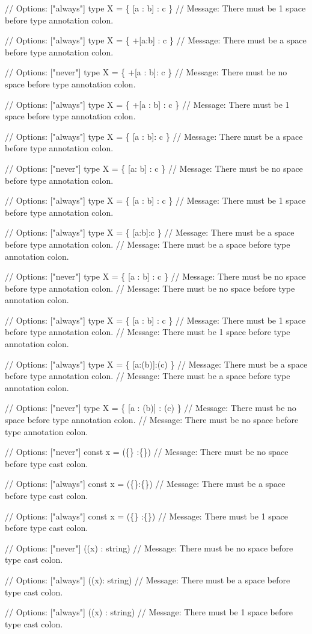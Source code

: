 \begin{DoxyCode}
// Options: ["always"]
type X = \{ [a  : b] : c \}
// Message: There must be 1 space before type annotation colon.

// Options: ["always"]
type X = \{ +[a:b] : c \}
// Message: There must be a space before type annotation colon.

// Options: ["never"]
type X = \{ +[a : b]: c \}
// Message: There must be no space before type annotation colon.

// Options: ["always"]
type X = \{ +[a  : b] : c \}
// Message: There must be 1 space before type annotation colon.

// Options: ["always"]
type X = \{ [a : b]: c \}
// Message: There must be a space before type annotation colon.

// Options: ["never"]
type X = \{ [a: b] : c \}
// Message: There must be no space before type annotation colon.

// Options: ["always"]
type X = \{ [a : b]  : c \}
// Message: There must be 1 space before type annotation colon.

// Options: ["always"]
type X = \{ [a:b]:c \}
// Message: There must be a space before type annotation colon.
// Message: There must be a space before type annotation colon.

// Options: ["never"]
type X = \{ [a : b] : c \}
// Message: There must be no space before type annotation colon.
// Message: There must be no space before type annotation colon.

// Options: ["always"]
type X = \{ [a  : b]  : c \}
// Message: There must be 1 space before type annotation colon.
// Message: There must be 1 space before type annotation colon.

// Options: ["always"]
type X = \{ [a:(b)]:(c) \}
// Message: There must be a space before type annotation colon.
// Message: There must be a space before type annotation colon.

// Options: ["never"]
type X = \{ [a : (b)] : (c) \}
// Message: There must be no space before type annotation colon.
// Message: There must be no space before type annotation colon.

// Options: ["never"]
const x = (\{\} :\{\})
// Message: There must be no space before type cast colon.

// Options: ["always"]
const x = (\{\}:\{\})
// Message: There must be a space before type cast colon.

// Options: ["always"]
const x = (\{\}  :\{\})
// Message: There must be 1 space before type cast colon.

// Options: ["never"]
((x) : string)
// Message: There must be no space before type cast colon.

// Options: ["always"]
((x): string)
// Message: There must be a space before type cast colon.

// Options: ["always"]
((x)  : string)
// Message: There must be 1 space before type cast colon.
\end{DoxyCode}


